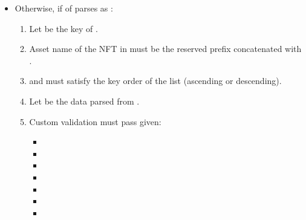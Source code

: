 \documentclass[../midgard.tex]{subfiles}
\begin{document}
\begin{description}
\begin{enumerate}
\begin{itemize}
\begin{enumerate}[resume]
                \item Custom validation must pass given:
                  \begin{itemize}
                    \item {}
                    \item {}
                    \item {}
                    \item {}
                    \item {}
                    \item {}
                  \end{itemize}
              \end{enumerate}
            \item Otherwise, if  of  parses as :
              \begin{enumerate}[resume]
                \item Let  be the key of .
                \item Asset name of the NFT in  must be the reserved prefix concatenated with .
                \item {} and  must satisfy the key order of the list (ascending or descending).
                \item Let  be the data parsed from .
                \item Custom validation must pass given:
                  \begin{itemize}
                    \item {}
                    \item {}
                    \item {}
                    \item {}
                    \item {}
                    \item {}
                    \item {}
                  \end{itemize}
              \end{enumerate}
          \end{itemize}

\end{enumerate}
\end{description}
\end{document}

